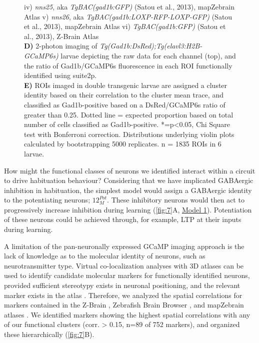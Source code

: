 \documentclass[9pt,lineno]{RandlettLab_elife}
\begin{document}
\begin{figure}
\begin{fullwidth}
\begin{center}
{iv) \emph{nns25}, aka \emph{TgBAC(gad1b:GFP)} (Satou et al., 2013), mapZebrain Atlas
v) \emph{nns26}, aka \emph{TgBAC(gad1b:LOXP-RFP-LOXP-GFP)} (Satou et al., 2013), mapZebrain Atlas
vi) \emph{TgBAC(gad1b:GFP)} (Satou et al., 2013), Z-Brain Atlas
\\ \textbf{D)} 2-photon imaging of \emph{Tg(Gad1b:DsRed);Tg(elavl3:H2B-GCaMP6s)} larvae depicting the raw data for each channel (top), and the ratio of Gad1b/GCaMP6s fluorescence in each ROI functionally identified using suite2p. 
\\ \textbf{E)} ROIs imaged in double transgenic larvae are assigned a cluster identity based on their correlation to the cluster mean trace, and classified as Gad1b-positive based on a DsRed/GCaMP6s ratio of greater than 0.25. Dotted line = expected proportion based on total number of cells classified as Gad1b-positive. *=p<0.05, Chi Square test with Bonferroni correction. Distributions underlying violin plots calculated by bootstrapping 5000 replicates. n = 1835 ROIs in 6 larvae. 
}
\label{fig:7}
\end{center}
\end{fullwidth}
\end{figure}

How might the functional classes of neurons we identified interact within a circuit to drive habituation behaviour? Considering that we have implicated GABAergic inhibition in habituation, the simplest model would assign a GABAergic identity to the potentiating neurons; $12_{M}^{Pot}$. These inhibitory neurons would then act to progressively increase inhibition during learning (\autoref{fig:7}A, \underline{Model 1}). Potentiation of these neurons could be achieved through, for example, LTP at their inputs during learning. 

A limitation of the pan-neuronally expressed GCaMP imaging approach is the lack of knowledge as to the molecular identity of neurons, such as neurotransmitter type. Virtual co-localization analyses with 3D atlases can be used to identify candidate molecular markers for functionally identified neurons, provided sufficient stereotypy exists in neuronal positioning, and the relevant marker exists in the atlas \cite{Dunn2016-vt, Randlett2015-hy}. Therefore, we analyzed the spatial correlations for markers contained in the Z-Brain \cite{Randlett2015-hy}, Zebrafish Brain Browser \cite{Gupta2018-ik, Marquart2017-na, Tabor2018-bw}, and mapZebrain atlases \cite{Kunst2018-az, Shainer2022-sn}. We identified markers showing the highest spatial correlations with any of our functional clusters (corr. > 0.15, n=89 of 752 markers), and organized these hierarchically (\autoref{fig:7}B).
\end{document}

